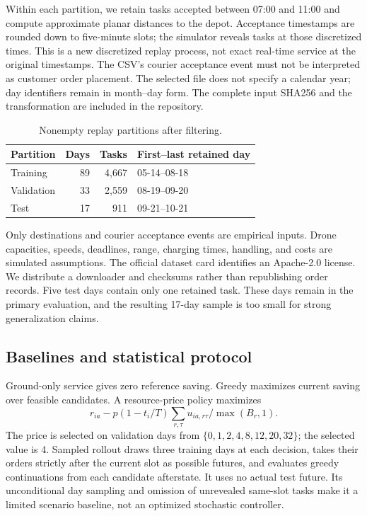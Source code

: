 \documentclass[11pt,a4paper]{article}
\begin{document}
Within each partition, we retain tasks accepted between 07:00 and 11:00 and compute approximate planar distances to the depot. Acceptance timestamps are rounded down to five-minute slots; the simulator reveals tasks at those discretized times. This is a new discretized replay process, not exact real-time service at the original timestamps. The CSV's courier acceptance event must not be interpreted as customer order placement. The selected file does not specify a calendar year; day identifiers remain in month--day form. The complete input SHA256 and the transformation are included in the repository.

\begin{table}[ht]
\centering\caption{Nonempty replay partitions after filtering.}
\begin{tabular}{lrrl}\toprule
Partition & Days & Tasks & First--last retained day\\\midrule
Training &89&4,667&05-14--08-18\\
Validation&33&2,559&08-19--09-20\\
Test&17&911&09-21--10-21\\\bottomrule
\end{tabular}
\end{table}

Only destinations and courier acceptance events are empirical inputs. Drone capacities, speeds, deadlines, range, charging times, handling, and costs are simulated assumptions. The official dataset card identifies an Apache-2.0 license. We distribute a downloader and checksums rather than republishing order records. Five test days contain only one retained task. These days remain in the primary evaluation, and the resulting 17-day sample is too small for strong generalization claims.

\subsection{Baselines and statistical protocol}
Ground-only service gives zero reference saving. Greedy maximizes current saving over feasible candidates. A resource-price policy maximizes
\begin{equation}
r_{ia}-p(1-t_i/T)\sum_{r,\tau}u_{ia,r\tau}/\max(B_r,1).
\end{equation}
The price is selected on validation days from $\{0,1,2,4,8,12,20,32\}$; the selected value is 4. Sampled rollout draws three training days at each decision, takes their orders strictly after the current slot as possible futures, and evaluates greedy continuations from each candidate afterstate. It uses no actual test future. Its unconditional day sampling and omission of unrevealed same-slot tasks make it a limited scenario baseline, not an optimized stochastic controller.
\end{document}
